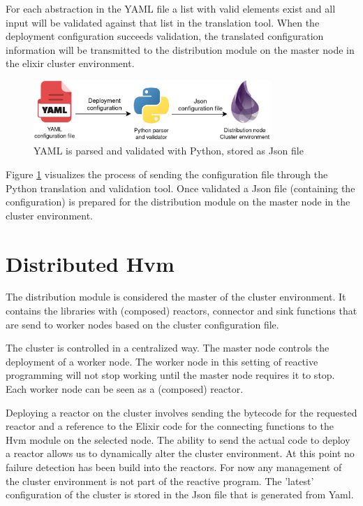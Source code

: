 \documentclass[a4paper]{book}
\begin{document}
 For each abstraction in the YAML file a list with valid elements exist and all input will be validated against that list in the translation tool. When the deployment configuration succeeds validation, the translated configuration information will be transmitted to the distribution module on the master node in the elixir cluster environment. 

\begin{figure}[h]
	\centering
	\includegraphics[width=0.8\textwidth]{yaml.drawio}
	\caption{YAML is parsed and validated with Python, stored as Json file}
	\label{fig:yaml}
\end{figure}  

Figure \ref{fig:yaml} visualizes the process of sending the configuration file through the Python translation and validation tool. Once validated a Json file (containing the configuration) is prepared for the distribution module on the master node in the cluster environment.

\newpage

\section{Distributed Hvm}
The distribution module is considered the master of the cluster environment. It contains the libraries with (composed) reactors, connector and sink functions that are send to worker nodes based on the cluster configuration file. 

The cluster is controlled in a centralized way. The master node controls the deployment of a worker node. The worker node in this setting of reactive programming will not stop working until the master node requires it to stop. Each worker node can be seen as a (composed) reactor.  

Deploying a reactor on the cluster involves sending the bytecode for the requested reactor and a reference to the Elixir code for the connecting functions to the Hvm module on the selected node. The ability to send the actual code to deploy a reactor allows us to dynamically alter the cluster environment. At this point no failure detection has been build into the reactors. For now any management of the cluster environment is not part of the reactive program. The 'latest' configuration of the cluster is stored in the Json file that is generated from Yaml.  
\end{document}
